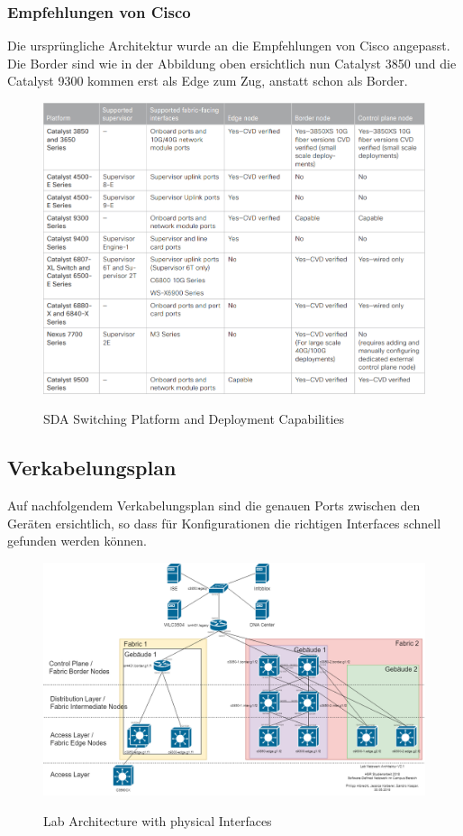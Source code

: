 \subsubsection{Empfehlungen von Cisco}
Die ursprüngliche Architektur wurde an die Empfehlungen von Cisco angepasst. Die Border sind wie in der Abbildung oben ersichtlich nun Catalyst 3850 und die Catalyst 9300 kommen erst als Edge zum Zug, anstatt schon als Border.
\begin{figure}[H]
	\centering
	\includegraphics[width=1\linewidth]{img/SDA-switchingplatformanddeploymentcapabilities.png}\\[1px]
	\caption{SDA Switching Platform and Deployment Capabilities \cite{sda-designguide}}
	\label{fig:SDA Switching Platform and Deployment Capabilities}
\end{figure}

\subsection{Verkabelungsplan}
Auf nachfolgendem Verkabelungsplan sind die genauen Ports zwischen den Geräten ersichtlich, so dass für Konfigurationen die richtigen Interfaces schnell gefunden werden können.
\begin{figure}[H]
	\centering
	\includegraphics[angle=90,width=0.9\linewidth]{img/LabNetworkArchitecture-Interfaces.png}\\[1px]
	\caption{Lab Architecture with physical Interfaces}
	\label{fig:Lab Architecture with physical Interfaces}
\end{figure}


